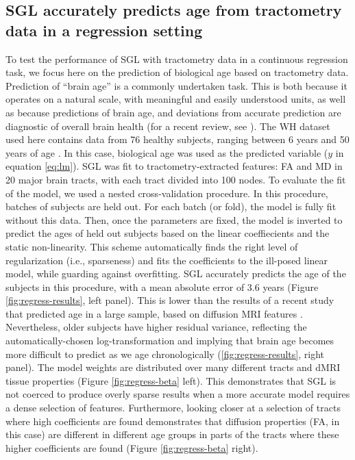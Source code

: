 \subsection*{SGL accurately predicts age from tractometry data in a regression setting}

To test the performance of SGL with tractometry data in a continuous regression
task, we focus here on the prediction of biological age based on tractometry
data. Prediction of ``brain age'' is a commonly undertaken task. This is both
because it operates on a natural scale, with meaningful and easily understood
units, as well as because predictions of brain age, and deviations from accurate
prediction are diagnostic of overall brain health (for a recent review, see
\cite{Cole2019-rz}). The WH dataset used here contains data from 76 healthy
subjects, ranging between 6 years and 50 years of age
\cite{yeatman2014lifespan}. In this case, biological age was used as the
predicted variable ($y$ in equation \ref{eq:lm}). SGL was fit to
tractometry-extracted features: FA and MD in 20 major brain tracts, with each
tract divided into 100 nodes. To evaluate the fit of the model, we used a nested
cross-validation procedure. In this procedure, batches of subjects are held out.
For each batch (or fold), the model is fully fit without this data. Then, once
the parameters are fixed, the model is inverted to predict the ages of held out
subjects based on the linear coeffiecients and the static non-linearity. This
scheme automatically finds the right level of regularization (i.e., sparseness)
and fits the coefficients to the ill-posed linear model, while guarding against
overfitting. SGL accurately predicts the age of the subjects in this procedure,
with a mean absolute error of 3.6 years (Figure \ref{fig:regress-results}, left
panel). This is lower than the results of a recent study that predicted age in a
large sample, based on diffusion MRI features \cite{Richard2018-ux}.
Nevertheless, older subjects have higher residual variance, reflecting the
automatically-chosen log-transformation and implying that brain age becomes more
difficult to predict as we age chronologically (\ref{fig:regress-results}, right
panel). The model weights are distributed over many different tracts and dMRI
tissue properties (Figure \ref{fig:regress-beta} left). This demonstrates that
SGL is not coerced to produce overly sparse results when a more accurate model
requires a dense selection of features. Furthermore, looking closer at a
selection of tracts where high coefficients are found demonstrates that
diffusion properties (FA, in this case) are different in different age groups in
parts of the tracts where these higher coefficients are found (Figure
\ref{fig:regress-beta} right).


